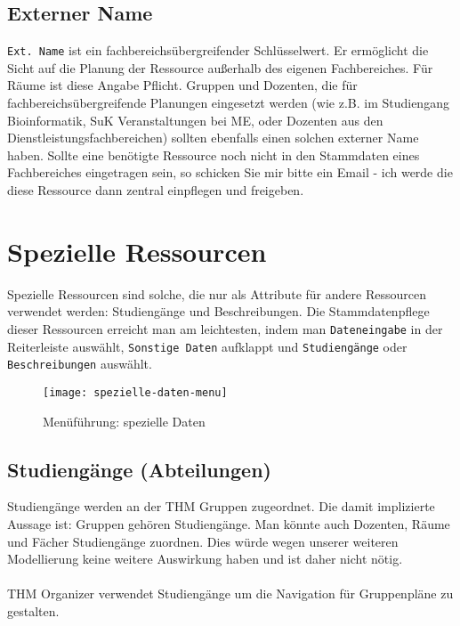 \newpage

\subsection{Externer Name}
\label{sec:ext-name}

\texttt{Ext. Name} ist ein fachbereichsübergreifender Schlüsselwert. Er ermöglicht die Sicht auf die Planung der Ressource außerhalb des eigenen Fachbereiches. Für Räume ist diese Angabe Pflicht. Gruppen und Dozenten, die für fachbereichsübergreifende Planungen eingesetzt werden (wie z.B. im Studiengang Bioinformatik, SuK Veranstaltungen bei ME, oder Dozenten aus den Dienstleistungsfachbereichen) sollten ebenfalls einen solchen externer Name haben. Sollte eine benötigte Ressource noch nicht in den Stammdaten eines Fachbereiches eingetragen sein, so schicken Sie mir bitte ein Email - ich werde die diese Ressource dann zentral einpflegen und freigeben.

\section{Spezielle Ressourcen}

Spezielle Ressourcen sind solche, die nur als Attribute für andere Ressourcen verwendet werden: Studiengänge und Beschreibungen. Die Stammdatenpflege dieser Ressourcen erreicht man am leichtesten, indem man \texttt{Dateneingabe} in der Reiterleiste auswählt, \texttt{Sonstige Daten} aufklappt und \texttt{Studiengänge} oder \texttt{Beschreibungen} auswählt.\\

\begin{figure}[h]
	\centering
	\texttt{[image: spezielle-daten-menu]}
	\vspace{-5pt}
	\caption{Menüführung: spezielle Daten}
	\label{fig:spezielle-daten-menu}
\end{figure}

\subsection{Studiengänge (Abteilungen)}

Studiengänge werden an der THM Gruppen zugeordnet. Die damit implizierte Aussage ist: Gruppen gehören Studiengänge. Man könnte auch Dozenten, Räume und Fächer Studiengänge zuordnen. Dies würde wegen unserer weiteren Modellierung keine weitere Auswirkung haben und ist daher nicht nötig.\\
\\
THM Organizer verwendet Studiengänge um die Navigation für Gruppenpläne zu gestalten.\\

